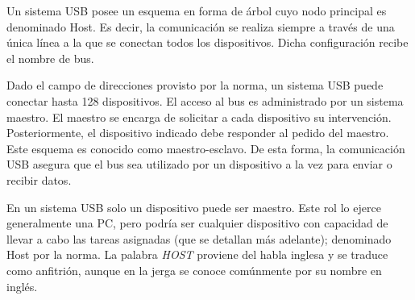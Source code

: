 Un sistema USB posee un esquema %
en forma de árbol cuyo nodo principal es denominado Host. Es decir, la comunicación se realiza siempre a través de una única línea a la que se conectan todos los dispositivos. Dicha configuración recibe el nombre de bus. 

Dado el campo de direcciones provisto por la norma, un sistema USB puede conectar hasta 128 dispositivos. El acceso al bus es administrado por un sistema maestro. El maestro se encarga de solicitar a cada dispositivo su intervención. Posteriormente, el dispositivo indicado debe responder al pedido del maestro. Este esquema es conocido como maestro-esclavo. De esta forma, la comunicación USB asegura que el bus sea utilizado por un dispositivo a la vez para enviar o recibir datos.%

En un sistema USB solo un dispositivo puede ser maestro. Este rol lo ejerce generalmente una PC, pero podría ser cualquier dispositivo con capacidad de llevar a cabo las tareas asignadas (que se detallan más adelante); denominado Host por la norma. La palabra {\it HOST} proviene del habla inglesa y se traduce como anfitrión, aunque en la jerga se conoce comúnmente por su nombre en inglés.%

